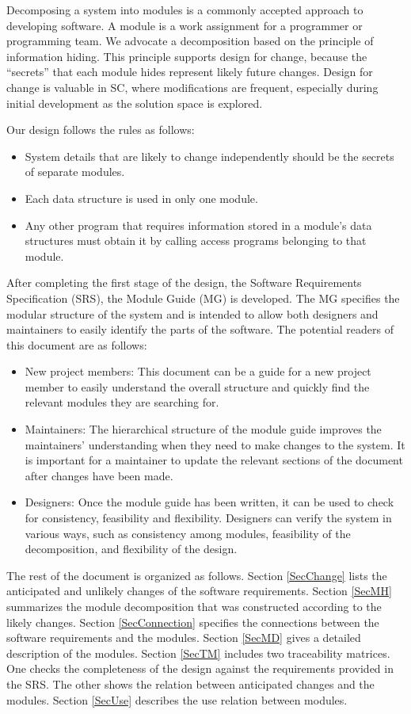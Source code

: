 \documentclass[12pt, titlepage]{article}
\begin{document}
Decomposing a system into modules is a commonly accepted approach to developing
software.  A module is a work assignment for a programmer or programming
team.  We advocate a decomposition
based on the principle of information hiding.  This
principle supports design for change, because the ``secrets'' that each module
hides represent likely future changes.  Design for change is valuable in SC,
where modifications are frequent, especially during initial development as the
solution space is explored.  

Our design follows the rules as follows:
\begin{itemize}
\item System details that are likely to change independently should be the
  secrets of separate modules.
\item Each data structure is used in only one module.
\item Any other program that requires information stored in a module's data
  structures must obtain it by calling access programs belonging to that module.
\end{itemize}

After completing the first stage of the design, the Software Requirements
Specification (SRS), the Module Guide (MG) is developed. The MG
specifies the modular structure of the system and is intended to allow both
designers and maintainers to easily identify the parts of the software.  The
potential readers of this document are as follows:

\begin{itemize}
\item New project members: This document can be a guide for a new project member
  to easily understand the overall structure and quickly find the
  relevant modules they are searching for.
\item Maintainers: The hierarchical structure of the module guide improves the
  maintainers' understanding when they need to make changes to the system. It is
  important for a maintainer to update the relevant sections of the document
  after changes have been made.
\item Designers: Once the module guide has been written, it can be used to
  check for consistency, feasibility and flexibility. Designers can verify the
  system in various ways, such as consistency among modules, feasibility of the
  decomposition, and flexibility of the design.
\end{itemize}

The rest of the document is organized as follows. Section
\ref{SecChange} lists the anticipated and unlikely changes of the software
requirements. Section \ref{SecMH} summarizes the module decomposition that
was constructed according to the likely changes. Section \ref{SecConnection}
specifies the connections between the software requirements and the
modules. Section \ref{SecMD} gives a detailed description of the
modules. Section \ref{SecTM} includes two traceability matrices. One checks
the completeness of the design against the requirements provided in the SRS. The
other shows the relation between anticipated changes and the modules. Section
\ref{SecUse} describes the use relation between modules.
\end{document}
